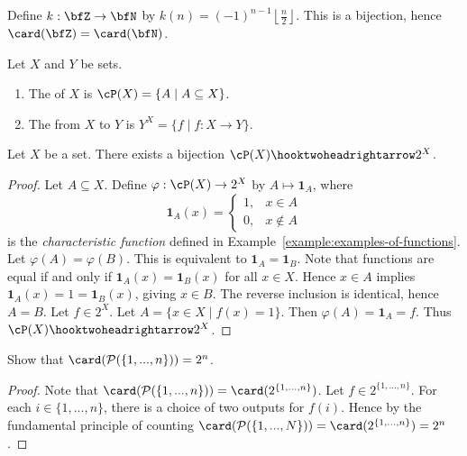         \begin{example}\label{example:more-cardinality-examples}
                Define $k:\bfZ \rightarrow \bfN$ by $k(n) = (-1)^{n-1} \left\lfloor \frac{n}{2} \right \rfloor$. This is a bijection, hence $\card(\bfZ) = \card(\bfN)$.
        \end{example}

    \begin{definition}
        Let $X$ and $Y$ be sets.
        \begin{enumerate}[label = (\arabic*)]
            \item The  of $X$ is $\cP(X) = \{A \mid A \subseteq X\}$.
            \item The  from $X$ to $Y$ is $Y^X = \{f \mid f:X \rightarrow Y\}$.
        \end{enumerate}
    \end{definition}

    \begin{lemma}
        Let $X$ be a set. There exists a bijection $\cP(X) \hooktwoheadrightarrow 2^X$.
    \end{lemma}
        \begin{proof}
            Let $A \subseteq X$. Define $\varphi:\cP(X) \rightarrow 2^X$ by $A \mapsto \mathbf{1}_A$, where
                \begin{equation*}
                \mathbf{1}_A(x) = 
                \begin{cases}
                    1, & x \in A \\
                    0, & x \not\in A
                \end{cases}
                \end{equation*}
            is the \textit{characteristic function} defined in Example~\ref{example:examples-of-functions}. Let $\varphi(A) = \varphi(B)$. This is equivalent to $\mathbf{1}_A = \mathbf{1}_B$. Note that functions are equal if and only if $\mathbf{1}_A(x) = \mathbf{1}_B(x)$ for all $x \in X$. Hence $x \in A$ implies $\mathbf{1}_A(x) = 1 = \mathbf{1}_B(x)$, giving $x \in B$. The reverse inclusion is identical, hence $A = B$. Let $f \in 2^X$. Let $A = \{x \in X \mid f(x) = 1\}$. Then $\varphi(A) = \mathbf{1}_A = f$. Thus $\cP(X) \hooktwoheadrightarrow 2^X$.
        \end{proof}

    \begin{exercise}\label{exercise:power-set-2n}
        Show that $\card(\mathcal{P}(\{1,...,n\})) = 2^n$.
    \end{exercise}
        \begin{proof}
            Note that $\card(\mathcal{P}(\{1,...,n\})) = \card(2^{\{1,...,n\}})$. Let $f \in 2^{\{1,...,n\}}$. For each $i \in \{1,...,n\}$, there is a choice of two outputs for $f(i)$. Hence by the fundamental principle of counting \newline$\card(\mathcal{P}(\{1,...,N\})) = \card(2^{\{1,...,n\}}) = 2^n$. 
        \end{proof}


